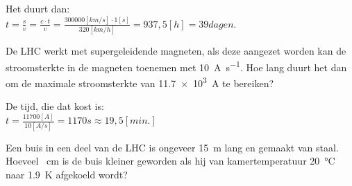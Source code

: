 \begin{questions}

Het duurt dan: \\
$t = \frac{s}{v} = \frac{c\cdot t}{v} = \frac{ 300000 [km/s] \cdot 1 [s]}{320 [km/h]} = 937,5 [h] = 39 dagen.$

\question
De LHC werkt met supergeleidende magneten, als deze aangezet worden kan de stroomsterkte
in de magneten toenemen met \SI{10}{\ampere\per\second}. Hoe lang duurt het dan om
de maximale stroomsterkte van \SI{11,7e3}{\ampere} te bereiken?


De tijd, die dat kost is: \\
$t = \frac{11700 [A]}{10 [A/s]} = 1170 s \approx 19,5 [min.]$

\question
Een buis in een deel van de LHC is ongeveer \SI{15}{\meter} lang en gemaakt van staal.
Hoeveel \SI{}{\centi\meter} is de buis kleiner geworden als hij van kamertemperatuur \SI{20}{\celsius}
naar \SI{1,9}{\kelvin} afgekoeld wordt?

































\end{questions} 

